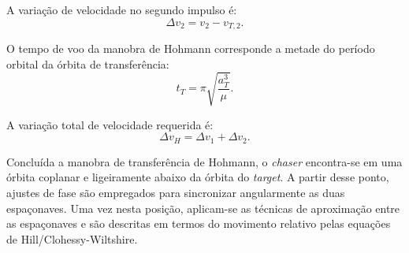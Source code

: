 A variação de velocidade no segundo impulso é:
\begin{equation}
    \Delta v_2 = v_2 - v_{T,2}.
\end{equation}

O tempo de voo da manobra de Hohmann corresponde a metade do período orbital da órbita de transferência:
\begin{equation}
    t_T = \pi \sqrt{\frac{a_T^3}{\mu}}.
\end{equation}

A variação total de velocidade requerida é:
\begin{equation}
    \Delta v_{H} = \Delta v_1 + \Delta v_2.
\end{equation}

Concluída a manobra de transferência de Hohmann, o \emph{chaser} encontra-se em uma órbita coplanar e ligeiramente abaixo da órbita do \emph{target}. 
A partir desse ponto, ajustes de fase são empregados para sincronizar angularmente as duas espaçonaves. 
Uma vez nesta posição, aplicam-se as técnicas de aproximação entre as espaçonaves e são descritas em termos do movimento relativo pelas equações de Hill/Clohessy-Wiltshire.